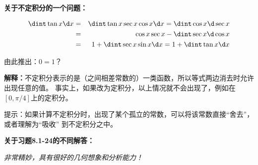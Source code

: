 \newpage

{\bf 关于不定积分的一个问题：}

\begin{eqnarray*}
	\dint\tan x\d x & = & \dint\tan x\sec x\cos x\d x=\dint\cos x\d\sec x\\
	& = & \cos x\sec x-\dint\sec x\d\cos x\\
	& = & 1+\dint\sec x\sin x\d x
	= 1+\dint\tan x\d x
\end{eqnarray*}

由此推出：$0=1$？

{\bf 解释：}不定积分表示的是（之间相差常数的）一类函数，所以等式两边消去时允许出现任意的值。
事实上，如果改为定积分，以上情况就不会出现了，例如在$[0,\pi/4]$上的定积分。

提示：如果计算不定积分时，出现了某个孤立的常数，可以将该常数直接“舍去”，或者理解为“吸收”
到不定积分之中。

\newpage

{\bf 关于习题8.1-24的不同解答：}

\begin{center}
\end{center}

{\it 非常精妙，具有很好的几何想象和分析能力！}

